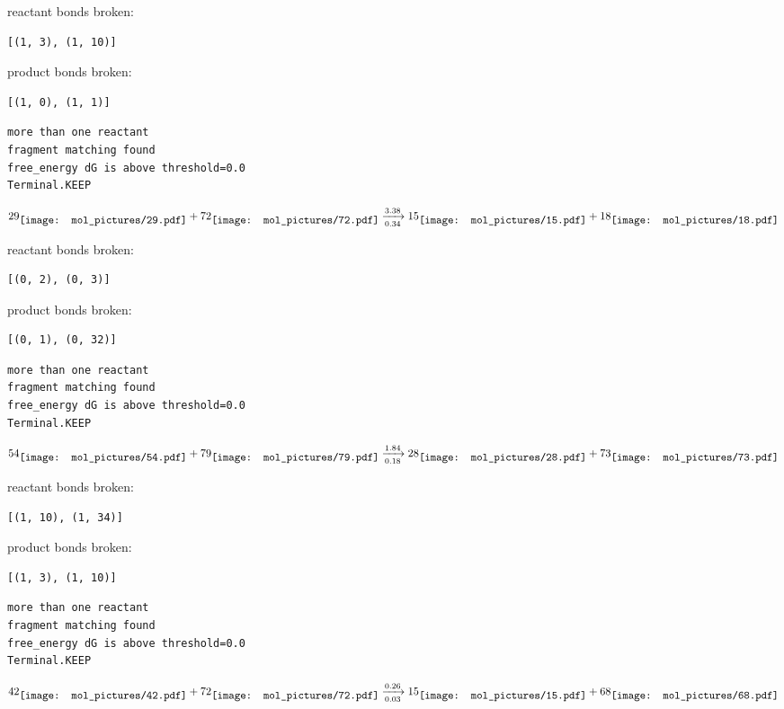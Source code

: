 \documentclass{article}
\begin{document}
reactant bonds broken:\begin{verbatim}
[(1, 3), (1, 10)]
\end{verbatim}
product bonds broken:\begin{verbatim}
[(1, 0), (1, 1)]
\end{verbatim}




\vspace{1cm}
\begin{verbatim}
more than one reactant
fragment matching found
free_energy dG is above threshold=0.0
Terminal.KEEP
\end{verbatim}
$$
29
\raisebox{-.5\height}{\texttt{[image: mol\_pictures/29.pdf]}}
+
72
\raisebox{-.5\height}{\texttt{[image: mol\_pictures/72.pdf]}}
\xrightarrow[0.34]{3.38}
15
\raisebox{-.5\height}{\texttt{[image: mol\_pictures/15.pdf]}}
+
18
\raisebox{-.5\height}{\texttt{[image: mol\_pictures/18.pdf]}}
$$


reactant bonds broken:\begin{verbatim}
[(0, 2), (0, 3)]
\end{verbatim}
product bonds broken:\begin{verbatim}
[(0, 1), (0, 32)]
\end{verbatim}




\vspace{1cm}
\begin{verbatim}
more than one reactant
fragment matching found
free_energy dG is above threshold=0.0
Terminal.KEEP
\end{verbatim}
$$
54
\raisebox{-.5\height}{\texttt{[image: mol\_pictures/54.pdf]}}
+
79
\raisebox{-.5\height}{\texttt{[image: mol\_pictures/79.pdf]}}
\xrightarrow[0.18]{1.84}
28
\raisebox{-.5\height}{\texttt{[image: mol\_pictures/28.pdf]}}
+
73
\raisebox{-.5\height}{\texttt{[image: mol\_pictures/73.pdf]}}
$$


reactant bonds broken:\begin{verbatim}
[(1, 10), (1, 34)]
\end{verbatim}
product bonds broken:\begin{verbatim}
[(1, 3), (1, 10)]
\end{verbatim}




\vspace{1cm}
\begin{verbatim}
more than one reactant
fragment matching found
free_energy dG is above threshold=0.0
Terminal.KEEP
\end{verbatim}
$$
42
\raisebox{-.5\height}{\texttt{[image: mol\_pictures/42.pdf]}}
+
72
\raisebox{-.5\height}{\texttt{[image: mol\_pictures/72.pdf]}}
\xrightarrow[0.03]{0.26}
15
\raisebox{-.5\height}{\texttt{[image: mol\_pictures/15.pdf]}}
+
68
\raisebox{-.5\height}{\texttt{[image: mol\_pictures/68.pdf]}}
$$
\end{document}
